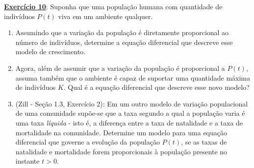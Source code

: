 \documentclass[oneside,12pt,a4paper]{report}
\begin{document}


    
    \noindent\textbf{\hyperlink{resp:ex10}{\hypertarget{quest:ex10}{Exercício 10}}}: Suponha que uma população humana com quantidade de indivíduos $P(t)$ viva em um ambiente qualquer.
    \begin{enumerate}[label=\alph*)]
        \item Assumindo que a variação da população é diretamente proporcional ao número de indivíduos, determine a equação diferencial que descreve esse modelo de crescimento.
        \item Agora, além de assumir que a variação da população é proporcional a $P(t)$, assuma também que o ambiente é capaz de suportar uma quantidade máxima de indivíduos $K$. Qual é a equação diferencial que descreve esse novo modelo?
        \item (Zill - Seção 1.3, Exercício 2): Em um outro modelo de variação populacional de uma comunidade supõe-se que a taxa segundo a qual a população varia é uma taxa \textit{líquida} - isto é, a diferença entre a taxa de natalidade e a taxa de mortalidade na comunidade. Determine um modelo para uma equação diferencial que governe a evolução da população $P(t)$, se as taxas de natalidade e mortalidade forem proporcionais à população presente no instante $t>0$.
    \end{enumerate}
    \vspace{0.5cm}
    
\end{document}
